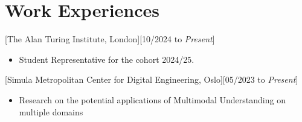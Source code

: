 \documentclass{resume}
\begin{document}

\ResumeTitle



\section{Work Experiences}

[The Alan Turing Institute, London][10/2024 to \textit{Present}]
\begin{itemize}
   \item Student Representative for the cohort 2024/25.
\end{itemize}

[Simula Metropolitan Center for Digital Engineering, Oslo][05/2023 to \textit{Present}]
\begin{itemize}
   \item Research on the potential applications of Multimodal Understanding on multiple domains  
\end{itemize}
\end{document}
